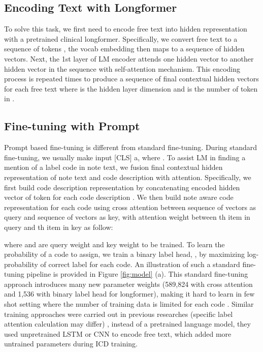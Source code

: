 \documentclass[11pt]{article}
\begin{document}
\subsection{Encoding Text with Longformer} \label{sec:enc}
To solve this task, we first need to encode free text into hidden representation with a pretrained clinical longformer. Specifically, we convert free text  to a sequence of tokens , the vocab embedding then maps  to a sequence of hidden vectors. Next, the 1st layer of LM encoder attends one hidden vector to another hidden vector in the sequence with self-attention mechanism. This encoding process is repeated  times to produce a sequence of final contextual hidden vectors  for each free text  where  is the hidden layer dimension and  is the number of token in \textcolor{ForestGreen}{}. 

\subsection{Fine-tuning with Prompt} \label{sec:prompt_method}

Prompt based fine-tuning is different from standard fine-tuning.
During standard fine-tuning, we usually make input  [CLS] a, where . 
To assist LM in finding a mention of a label code in note text, we \textcolor{CarnationPink}{fusion} final contextual hidden representation of note text \textcolor{ForestGreen}{} and code description \textcolor{BrickRed}{} with attention.
Specifically, we first build code description representation \textcolor{BrickRed}{}  by concatenating encoded hidden vector \textcolor{BrickRed}{}   of token  for each code description \textcolor{BrickRed}{}.
We then build note aware code representation  for each code using cross attention between sequence of vectors \textcolor{BrickRed}{} as query and sequence of vectors \textcolor{ForestGreen}{} as key, with attention weight  between th item in query and th item in key as follow:

\vspace{4mm}

\vspace{4mm}

\noindent where  and  are query weight and key weight to be trained.
To learn the probability of a code to assign, we train a binary label head, , by maximizing log-probability of correct label for each code. An illustration of such a standard fine-tuning pipeline is provided in Figure \ref{fig:model} (a). This standard fine-tuning approach introduces many new parameter weights (589,824 with cross attention and 1,536 with binary label head for longformer), making it hard to learn in few shot setting where the number of training data is limited for each code \citep{gao-etal-2021-making}.
Similar training approaches were carried out in previous researches \citep{Mullenbach2018ExplainablePO, Li2020ICDCF, Kim2021ReadAA, luo-etal-2021-fusion, Sun2021MultitaskBA, zhou-etal-2021-automatic}
(specific label attention calculation may differ) 
, instead of a pretrained language model, they used unpretrained LSTM or CNN to encode free text, which added more untrained parameters during ICD training.
\end{document}
